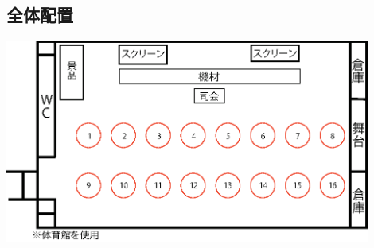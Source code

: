 \documentclass[a4j]{jarticle}
\begin{document}
\subsection{全体配置}
\begin{center}
\includegraphics[width=12cm]{./21/reiout1.eps}
\end{center}
\end{document}
